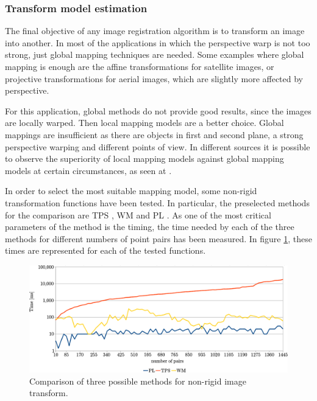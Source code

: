 \subsubsection{Transform model estimation}\label{ch:chapter01_01_02_03}

The final objective of any image registration algorithm is to transform an image into another. In most of the applications in which the perspective warp is not too strong, just global mapping techniques are needed. Some examples where global mapping is enough are the affine transformations for satellite images, or projective transformations for aerial images, which are slightly more affected by perspective.

For this application, global methods do not provide good results, since the images are locally warped. Then local mapping models are a better choice. Global mappings are insufficient as there are objects in first and second plane, a strong perspective warping and different points of view. In different sources it is possible to observe the superiority of local mapping models against global mapping models at certain circumstances, as seen at \cite{goshtasby1988image, ehlers1994high, wiemker1996application, flusser1992adaptive}.

In order to select the most suitable mapping model, some non-rigid transformation functions have been tested. In particular, the preselected methods for the comparison are \ac{TPS} \citep{harder1972interpolation}, \ac{WM} \citep{goshtasby1993design} and \ac{PL} \citep{goshtasby1986piecewise}. As one of the most critical parameters of the method is the timing, the time needed by each of the three methods for different numbers of point pairs has been measured. In figure \ref{fig:cp01_transform_model_time}, these times are represented for each of the tested functions.

\begin{figure}[h!]
\centering
\includegraphics[width=\textwidth]{compTransf}
\caption{Comparison of three possible methods for non-rigid image transform.}\label{fig:cp01_transform_model_time}
\end{figure}

